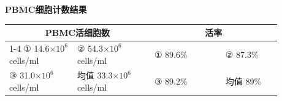 \documentclass[UTF8,10pt,a4paper,fontset=fandol]{ctexart}
\newcommand{\fieldvalue}[1]{#1}
\newcommand{\handwritten}[1]{#1}
\begin{document}
\vspace{0.5em}

\begin{center}
\textbf{PBMC细胞计数结果}
\end{center}

\begin{tabular}{|p{0.22\linewidth}|p{0.25\linewidth}|p{0.23\linewidth}|p{0.18\linewidth}|}
\hline
\multicolumn{2}{|c|}{PBMC活细胞数} & \multicolumn{2}{c|}{活率}\\
\cline{1-4}
①
\fieldvalue{\handwritten{14.6}}\(\times10^{6}\) cells/ml
&
②
\fieldvalue{\handwritten{54.3}}\(\times10^{6}\) cells/ml
&
①
\fieldvalue{\handwritten{89.6}}\%
&
②
\fieldvalue{\handwritten{87.3}}\%
\\ \hline
③
\fieldvalue{\handwritten{31.0}}\(\times10^{6}\) cells/ml
&
均值
\fieldvalue{\handwritten{33.3}}\(\times10^{6}\) cells/ml
&
③
\fieldvalue{\handwritten{89.2}}\%
&
均值
\fieldvalue{\handwritten{89}}\%
\\ \hline
\end{tabular}

\vspace{0.5em}
\end{document}
